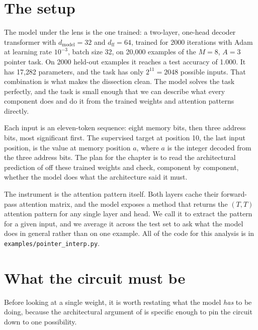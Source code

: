 
\section{The setup}\label{sec:interp-setup}

The model under the lens is the one  trained: a two-layer,
one-head decoder transformer with $d_{\text{model}} = 32$ and
$d_{\text{ff}} = 64$, trained for 2000 iterations with Adam at learning rate
$10^{-3}$, batch size 32, on 20{,}000 examples of the $M = 8$, $A = 3$ pointer
task. On 2000 held-out examples it reaches a test accuracy of 1.000. It has
17{,}282 parameters, and the task has only $2^{11} = 2048$ possible inputs. That
combination is what makes the dissection clean. The model solves the task
perfectly, and the task is small enough that we can describe what every
component does and do it from the trained weights and attention patterns
directly.

Each input is an eleven-token sequence: eight memory bits, then three address
bits, most significant first. The supervised target at position 10, the last
input position, is the value at memory position $a$, where $a$ is the integer
decoded from the three address bits. The plan for the chapter is to read the
architectural prediction of  off these trained weights and
check, component by component, whether the model does what the architecture said
it must.

The instrument is the attention pattern itself. Both layers cache their
forward-pass attention matrix, and the model exposes a method that returns the
$(T, T)$ attention pattern for any single layer and head. We call it to extract
the pattern for a given input, and we average it across the test set to ask what
the model does in general rather than on one example. All of the code for this
analysis is in \texttt{examples/pointer\_interp.py}.

\section{What the circuit must be}\label{sec:circuit-restated}

Before looking at a single weight, it is worth restating what the model
\emph{has} to be doing, because the architectural argument of
 is specific enough to pin the circuit down to one
possibility.

